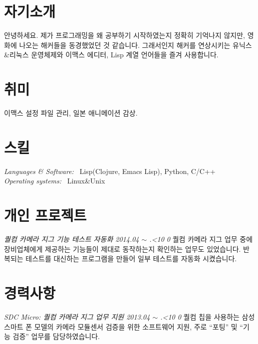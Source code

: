 \documentclass[line,margin]{res}
\renewcommand{\today}{\number\year.\ifnum\number\month<10 0\fi \number\month}
\begin{document}
\address{E-mail: vmfhrmfoaj@yahoo.com}


\begin{resume}

  \section{자기소개}

  안녕하세요.
  제가 프로그래밍을 왜 공부하기 시작하였는지 정확히 기억나지 않지만, 영화에 나오는 해커들을 동경했었던 것 같습니다.
  그래서인지 해커를 연상시키는 유닉스\&리눅스 운영체제와 이맥스 에디터, Lisp 계열 언어들을 즐겨 사용합니다.


  \section{취미}

  이맥스 설정 파일 관리, 일본 애니메이션 감상.


  \section{스킬}

  {\sl Languages \& Software:} ~Lisp({\small Clojure, Emacs Lisp}), Python, C/C++ \\
  {\sl Operating systems:} ~Linux\&Unix


  \section{개인 프로젝트}

  {\sl 퀄컴 카메라 지그 기능 테스트 자동화 \hfill 2014.04 $\sim$ \today}
  \vspace{1mm}
  \newline
  {
    \small
    퀄컴 카메라 지그 업무 중에 장비업체에게 제공하는 기능들이 제대로 동작하는지 확인하는 업무도 있었습니다.
    반복되는 테스트를 대신하는 프로그램을 만들어 일부 테스트를 자동화 시켰습니다.
  }


  \section{경력사항}

  {\sl SDC Micro: 퀄컴 카메라 지그 업무 지원 \hfill 2013.04 $\sim$ \today}
  \vspace{1mm}
  \newline
  {
    \small
    퀄컴 칩을 사용하는 삼성 스마트 폰 모델의 카메라 모듈센서 검증을 위한 소프트웨어 지원,
    주로 ``포팅'' 및 ``기능 검증'' 업무를 담당하였습니다.
  }


\end{resume}
\end{document}
